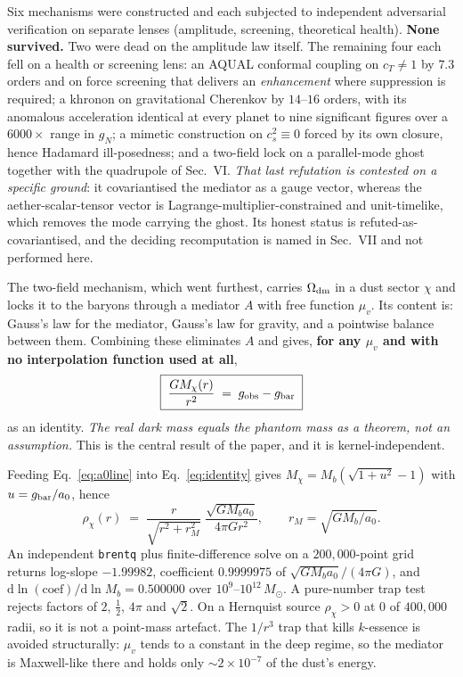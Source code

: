 \documentclass[aps,prd,twocolumn,superscriptaddress,nofootinbib,floatfix]{revtex4-2}
\begin{document}
Six mechanisms were constructed and each subjected to independent adversarial
verification on separate lenses (amplitude, screening, theoretical health). \textbf{None
survived.} Two were dead on the amplitude law itself. The remaining four each fell on a
health or screening lens: an AQUAL conformal coupling on $c_T\neq1$ by $7.3$ orders and on
force screening that delivers an \emph{enhancement} where suppression is required; a
khronon on gravitational Cherenkov by $14$--$16$ orders, with its anomalous acceleration
identical at every planet to nine significant figures over a $6000\times$ range in $g_N$; a
mimetic construction on $c_s^2\equiv0$ forced by its own closure, hence Hadamard
ill-posedness; and a two-field lock on a parallel-mode ghost together with the quadrupole
of Sec.~VI. \emph{That last refutation is contested on a specific ground}: it
covariantised the mediator as a gauge vector, whereas the aether-scalar-tensor vector is
Lagrange-multiplier-constrained and unit-timelike, which removes the mode carrying the
ghost. Its honest status is refuted-as-covariantised, and the deciding recomputation is
named in Sec.~VII and not performed here.

The two-field mechanism, which went furthest, carries $\Omega_{\rm dm}$ in a dust sector $\chi$ and locks it to
the baryons through a mediator $A$ with free function $\mu_v$. Its content is: Gauss's law
for the mediator, Gauss's law for gravity, and a pointwise balance between them. Combining
these eliminates $A$ and gives, \textbf{for any $\mu_v$ and with no interpolation function
used at all},
\begin{equation}
\boxed{\;\frac{G M_\chi(r)}{r^2} \;=\; g_{\rm obs} - g_{\rm bar}\;}
\label{eq:identity}
\end{equation}
as an identity. \emph{The real dark mass equals the phantom mass as a theorem, not an
assumption.} This is the central result of the paper, and it is kernel-independent.

Feeding Eq.~\eqref{eq:a0line} into Eq.~\eqref{eq:identity} gives
$M_\chi = M_b(\sqrt{1+u^2}-1)$ with $u = g_{\rm bar}/a_0$, hence
\begin{equation}
\rho_\chi(r) \;=\; \frac{r}{\sqrt{r^2+r_M^2}}\;
\frac{\sqrt{G M_b a_0}}{4\pi G r^2},
\qquad r_M=\sqrt{GM_b/a_0}.
\end{equation}
An independent \texttt{brentq} plus finite-difference solve on a $200{,}000$-point grid
returns log-slope $-1.99982$, coefficient $0.9999975$ of $\sqrt{GM_ba_0}/(4\pi G)$, and
$\mathrm{d}\ln(\text{coef})/\mathrm{d}\ln M_b = 0.500000$ over $10^{9}$--$10^{12}\,M_\odot$.
A pure-number trap test rejects factors of $2$, $\tfrac12$, $4\pi$ and $\sqrt2$. On a
Hernquist source $\rho_\chi>0$ at $0$ of $400{,}000$ radii, so it is not a point-mass
artefact. The $1/r^3$ trap that kills $k$-essence is avoided structurally: $\mu_v$ tends
to a constant in the deep regime, so the mediator is Maxwell-like there and holds only
$\sim2\times10^{-7}$ of the dust's energy.
\end{document}
